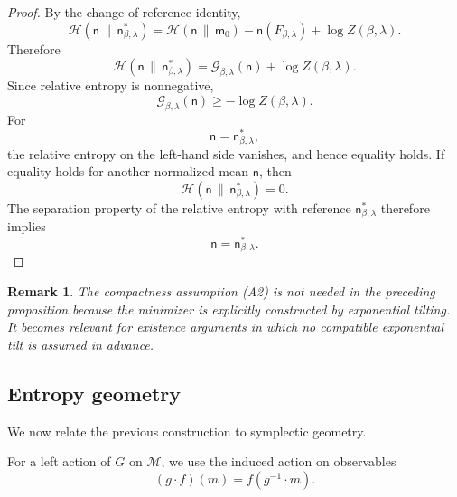 \documentclass[11pt,reqno]{amsart}
\newtheorem{rem}[Theorem]{Remark}
\begin{document}
\begin{proof}
By the change-of-reference identity,
\[
\mathcal H\left(
\mathsf n\,\|\,\mathsf n_{\beta,\lambda}^{*}
\right)
=
\mathcal H(\mathsf n\,\|\,\mathsf m_0)
-\mathsf n(F_{\beta,\lambda})
+\log Z(\beta,\lambda).
\]
Therefore
\[
\mathcal H\left(
\mathsf n\,\|\,\mathsf n_{\beta,\lambda}^{*}
\right)
=
\mathcal G_{\beta,\lambda}(\mathsf n)
+\log Z(\beta,\lambda).
\]
Since relative entropy is nonnegative,
\[
\mathcal G_{\beta,\lambda}(\mathsf n)
\geq
-\log Z(\beta,\lambda).
\]
For
\[
\mathsf n=\mathsf n_{\beta,\lambda}^{*},
\]
the relative entropy on the left-hand side vanishes, and hence equality
holds. If equality holds for another normalized mean $\mathsf n$, then
\[
\mathcal H\left(
\mathsf n\,\|\,\mathsf n_{\beta,\lambda}^{*}
\right)=0.
\]
The separation property of the relative entropy with reference
$\mathsf n_{\beta,\lambda}^{*}$ therefore implies
\[
\mathsf n=\mathsf n_{\beta,\lambda}^{*}.
\]
\end{proof}

\begin{rem}
The compactness assumption \textup{(A2)} is not needed in the preceding
proposition because the minimizer is explicitly constructed by
exponential tilting. It becomes relevant for existence arguments in
which no compatible exponential tilt is assumed in advance.
\end{rem}

\subsection{Entropy geometry}

We now relate the previous construction to symplectic geometry.

For a left action of $G$ on $\mathcal M$, we use the induced action on
observables
\[
(g\cdot f)(m)=f(g^{-1}\cdot m).
\]
\end{document}
